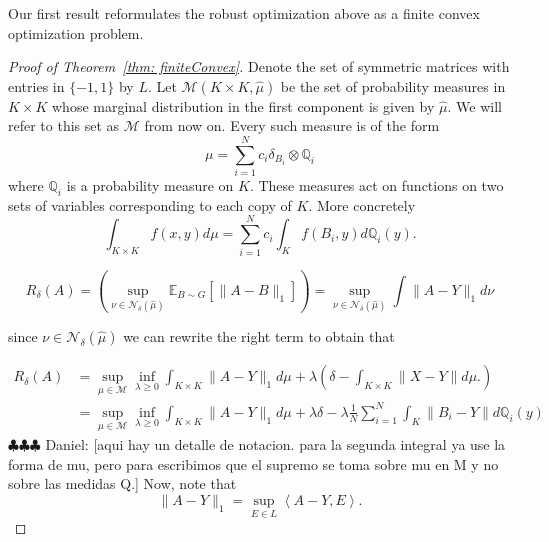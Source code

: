 \documentclass[12pt]{amsart}
\theoremstyle{remark}
\newcommand{\EE}{\mathbb{E}}
\newcommand{\ddr}[1]{{\color{blue} \sf $\clubsuit\clubsuit\clubsuit$ Daniel: [#1]}}
\begin{document}
Our first result reformulates the robust optimization above as a finite convex optimization problem.
\begin{proof}[Proof of Theorem~\ref{thm: finiteConvex}]


Denote the set of symmetric matrices with entries in $\{-1,1\}$ by $L$.
Let $\mathcal{M}(K\times K,\hat{\mu})$ be the set of probability measures in $K\times K$ whose marginal distribution in the first component is given by $\hat{\mu}$. We will refer to this set as $\mathcal{M}$ from now on. Every such measure is of the form 
\[\mu = \sum_{i=1}^N c_i \delta_{B_i}\otimes \mathbb{Q}_i\]
where $\mathbb{Q}_i$ is a probability measure on $K$. These measures act on functions on two sets of variables corresponding to each copy of $K$. More concretely
\[\int_{K\times K} f(x,y) d\mu = \sum_{i=1}^ N c_i \int_K f(B_i,y)d\mathbb{Q}_i(y).\]




\[R_{\delta}(A)=\left(\sup_{\nu\in \mathcal{N}_{\delta}(\hat{\mu})} \EE_{B\sim G}[\|A-B\|_1]\right) = \sup_{\nu\in \mathcal{N}_{\delta}(\hat{\mu})} \int \|A-Y\|_1 d\nu \]

since $ \nu\in \mathcal{N}_{\delta}(\hat{\mu}) $ we can rewrite the right term to obtain that

\begin{equation}\label{rdelta}
\begin{aligned}
R_{\delta}(A) &= \sup_{\mu \in \mathcal{M}} \inf_{\lambda \geq 0} \int_{K \times K}\|A-Y\|_1 d\mu + \lambda \left (  \delta - \int_{K \times K} \|X-Y\|d\mu.\right )\\
&=  \sup_{\mu \in \mathcal{M}} \inf_{\lambda \geq 0} \int_{K \times K}\|A-Y\|_1 d\mu + \lambda \delta - \lambda \frac{1}{N}\sum_{i=1}^{N} \int_K \|B_i-Y\|d\mathbb{Q}_i(y)
\end{aligned}
\end{equation}
\ddr{aqui hay un detalle de notacion.  para la segunda integral ya use la forma de mu, pero para escribimos que el supremo se toma sobre mu en M y no sobre las medidas Q.}
Now, note that
\[
\|A-Y\|_1 = \sup_{E \in L} \left \langle A-Y,E\right \rangle.
\]




\end{proof}
\end{document}
